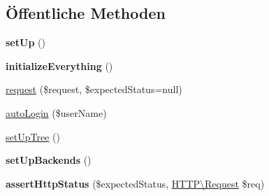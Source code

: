 \subsection*{Öffentliche Methoden}
\begin{DoxyCompactItemize}
\item 
\mbox{\label{class_sabre_1_1_d_a_v_server_test_a77f26432519e3e59fb50459c89c6f4b8}} 
{\bfseries set\+Up} ()
\item 
\mbox{\label{class_sabre_1_1_d_a_v_server_test_af292d0b2622de979b6471c19fb1b66bf}} 
{\bfseries initialize\+Everything} ()
\item 
\mbox{\hyperlink{class_sabre_1_1_d_a_v_server_test_a26ecfb70e9abddb8e57e9035a1990ae0}{request}} (\$request, \$expected\+Status=null)
\item 
\mbox{\hyperlink{class_sabre_1_1_d_a_v_server_test_a288bc7a69291333bf536067840898937}{auto\+Login}} (\$user\+Name)
\item 
\mbox{\hyperlink{class_sabre_1_1_d_a_v_server_test_a7289bb00f91e1ae7a6878aa3ec6c4d2c}{set\+Up\+Tree}} ()
\item 
\mbox{\label{class_sabre_1_1_d_a_v_server_test_aec8743b99b974b78b7f30fa14cc9c5bb}} 
{\bfseries set\+Up\+Backends} ()
\item 
\mbox{\label{class_sabre_1_1_d_a_v_server_test_ac7f6d59dc8fd7256c02dba7e579323ac}} 
{\bfseries assert\+Http\+Status} (\$expected\+Status, \mbox{\hyperlink{class_sabre_1_1_h_t_t_p_1_1_request}{H\+T\+T\+P\textbackslash{}\+Request}} \$req)
\end{DoxyCompactItemize}
